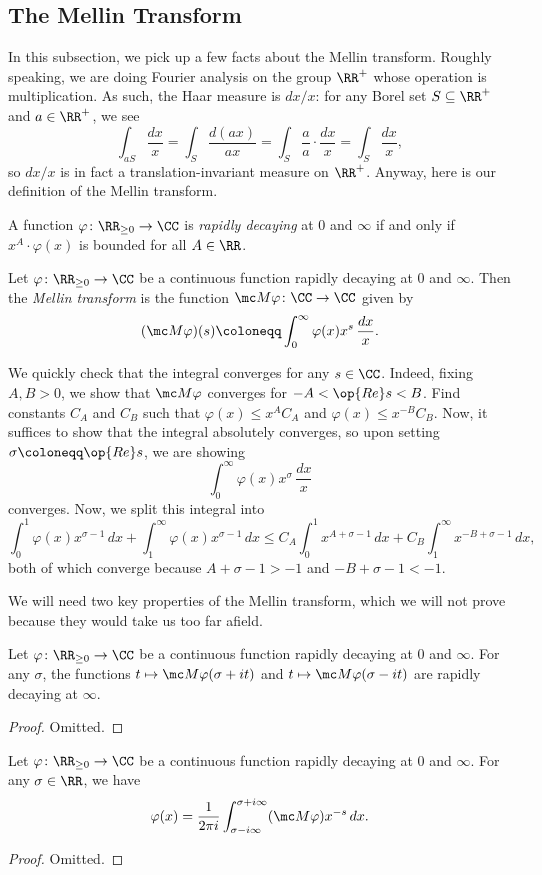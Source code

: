 \documentclass[../notes.tex]{subfiles}
\begin{document}
\subsection{The Mellin Transform}
In this subsection, we pick up a few facts about the Mellin transform. Roughly speaking, we are doing Fourier analysis on the group $\RR^+$ whose operation is multiplication. As such, the Haar measure is $dx/x$: for any Borel set $S\subseteq\RR^+$ and $a\in\RR^+$, we see
\[\int_{aS}\frac{dx}x=\int_S\frac{d(ax)}{ax}=\int_S\frac aa\cdot\frac{dx}x=\int_S\frac{dx}x,\]
so $dx/x$ is in fact a translation-invariant measure on $\RR^+$. Anyway, here is our definition of the Mellin transform.
\begin{definition}
	A function $\varphi\colon\RR_{\ge0}\to\CC$ is \textit{rapidly decaying} at $0$ and $\infty$ if and only if $x^A\cdot\varphi(x)$ is bounded for all $A\in\RR$.
\end{definition}
\begin{definition}
	Let $\varphi\colon\RR_{\ge0}\to\CC$ be a continuous function rapidly decaying at $0$ and $\infty$. Then the \textit{Mellin transform} is the function $\mc M\varphi\colon\CC\to\CC$ given by
	\[(\mc M\varphi)(s)\coloneqq\int_0^\infty\varphi(x)x^s\,\frac{dx}x.\]
\end{definition}
We quickly check that the integral converges for any $s\in\CC$. Indeed, fixing $A,B>0$, we show that $\mc M\varphi$ converges for $-A<\op{Re}s<B$. Find constants $C_A$ and $C_B$ such that $\varphi(x)\le x^{A}C_A$ and $\varphi(x)\le x^{-B}C_B$. Now, it suffices to show that the integral absolutely converges, so upon setting $\sigma\coloneqq\op{Re}s$, we are showing
\[\int_0^\infty\varphi(x)x^\sigma\,\frac{dx}x\]
converges. Now, we split this integral into
\[\int_0^1\varphi(x)x^{\sigma-1}\,dx+\int_1^\infty\varphi(x)x^{\sigma-1}\,dx\le C_A\int_0^1x^{A+\sigma-1}\,dx+C_B\int_1^\infty x^{-B+\sigma-1}\,dx,\]
both of which converge because $A+\sigma-1>-1$ and $-B+\sigma-1<-1$.

We will need two key properties of the Mellin transform, which we will not prove because they would take us too far afield.
\begin{proposition}
	Let $\varphi\colon\RR_{\ge0}\to\CC$ be a continuous function rapidly decaying at $0$ and $\infty$. For any $\sigma$, the functions $t\mapsto\mc M\varphi(\sigma+it)$ and $t\mapsto\mc M\varphi(\sigma-it)$ are rapidly decaying at $\infty$.
\end{proposition}
\begin{proof}
	Omitted.
\end{proof}
\begin{theorem}
	Let $\varphi\colon\RR_{\ge0}\to\CC$ be a continuous function rapidly decaying at $0$ and $\infty$. For any $\sigma\in\RR$, we have
	\[\varphi(x)=\frac1{2\pi i}\int_{\sigma-i\infty}^{\sigma+i\infty}(\mc M\varphi)x^{-s}\,dx.\]
\end{theorem}
\begin{proof}
	Omitted.
\end{proof}
\end{document}
